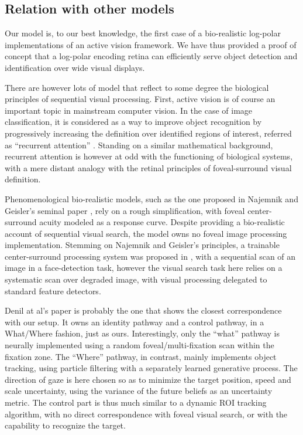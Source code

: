 
\subsection*{Relation with other models}

Our model is, to our best knowledge, the first case of a bio-realistic log-polar implementations of an active vision framework. We have thus provided a proof of concept that a log-polar encoding retina can efficiently serve object detection and identification over wide visual displays. 

There are however lots of model that reflect to some degree the biological principles of sequential visual processing. 
First, active vision is of course an important topic in mainstream computer vision. In the case of image classification, it is considered as a way to improve object recognition by progressively increasing the definition over identified regions of interest, referred as ``recurrent attention'' \cite{mnih2014recurrent,fu2017look}. Standing on a similar mathematical background, recurrent attention is however at odd with the functioning of biological systems, with a mere distant analogy with the retinal principles of foveal-surround visual definition. 

Phenomenological bio-realistic models, such as the one proposed in Najemnik and Geisler's seminal paper \cite{Najemnik05}, rely on a rough simplification, with foveal center-surround acuity modeled as a response curve. Despite providing a bio-realistic account of sequential visual search, the model owns no foveal image processing implementation. Stemming on Najemnik and Geisler's principles, a trainable center-surround processing system was proposed in \cite{Butko2010infomax}, with a sequential scan of an image in a face-detection task, however the visual search task here relies  on a systematic scan over degraded image, with visual processing delegated to standard feature detectors.  

Denil at al's paper \cite{denil2012learning} is probably the one that shows the closest correspondence with our setup. It owns an identity pathway and a control pathway, in a What/Where fashion, just as ours. Interestingly, only the ``what'' pathway is neurally implemented using a random foveal/multi-fixation scan within the fixation zone. The ``Where'' pathway, in contrast, mainly implements object tracking, using  particle filtering with a separately learned generative process. The direction of gaze is here chosen so as to minimize the target position, speed and scale uncertainty, using the variance of the future beliefs as an uncertainty metric. The control part is thus much similar to a dynamic ROI tracking algorithm, with no direct correspondence with foveal visual search, or with the capability to recognize the target.   